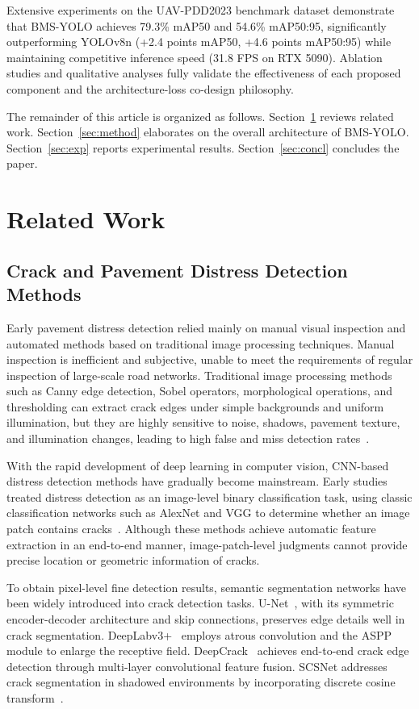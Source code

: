 \documentclass{ieeeaccess}
\begin{document}
{Extensive experiments on the UAV-PDD2023 benchmark dataset demonstrate that BMS-YOLO achieves 79.3\% mAP50 and 54.6\% mAP50:95, significantly outperforming YOLOv8n (+2.4 points mAP50, +4.6 points mAP50:95) while maintaining competitive inference speed (31.8 FPS on RTX 5090). Ablation studies and qualitative analyses fully validate the effectiveness of each proposed component and the architecture-loss co-design philosophy.

The remainder of this article is organized as follows. Section~\ref{sec:related} reviews related work. Section~\ref{sec:method} elaborates on the overall architecture of BMS-YOLO. Section~\ref{sec:exp} reports experimental results. Section~\ref{sec:concl} concludes the paper.

\section{Related Work}
\label{sec:related}

\subsection{Crack and Pavement Distress Detection Methods}

Early pavement distress detection relied mainly on manual visual inspection and automated methods based on traditional image processing techniques. Manual inspection is inefficient and subjective, unable to meet the requirements of regular inspection of large-scale road networks. Traditional image processing methods such as Canny edge detection, Sobel operators, morphological operations, and thresholding can extract crack edges under simple backgrounds and uniform illumination, but they are highly sensitive to noise, shadows, pavement texture, and illumination changes, leading to high false and miss detection rates~\cite{Dorafshan2018}.

With the rapid development of deep learning in computer vision, CNN-based distress detection methods have gradually become mainstream. Early studies treated distress detection as an image-level binary classification task, using classic classification networks such as AlexNet and VGG to determine whether an image patch contains cracks~\cite{Ali2021}. Although these methods achieve automatic feature extraction in an end-to-end manner, image-patch-level judgments cannot provide precise location or geometric information of cracks.

To obtain pixel-level fine detection results, semantic segmentation networks have been widely introduced into crack detection tasks. U-Net~\cite{Ronneberger2015}, with its symmetric encoder-decoder architecture and skip connections, preserves edge details well in crack segmentation. DeepLabv3+~\cite{Chen2017} employs atrous convolution and the ASPP module to enlarge the receptive field. DeepCrack~\cite{Zou2018} achieves end-to-end crack edge detection through multi-layer convolutional feature fusion. SCSNet addresses crack segmentation in shadowed environments by incorporating discrete cosine transform~\cite{Zhang2024}.

}
\end{document}
